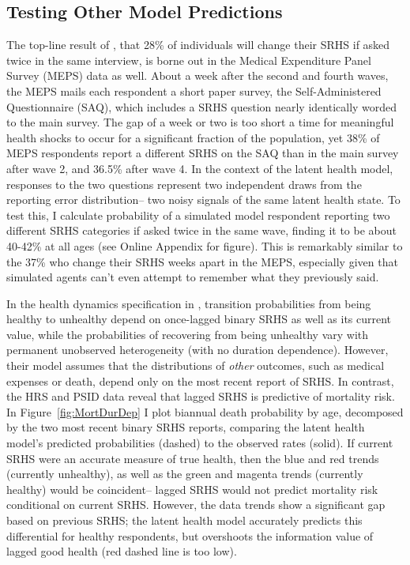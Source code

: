 \documentclass[12pt,pdftex,letterpaper]{article}
\begin{document}
\subsection{Testing Other Model Predictions}\label{sec:Predictions}

The top-line result of \cite{Crossley02}, that 28\% of individuals will change their SRHS if asked twice in the same interview, is borne out in the Medical Expenditure Panel Survey (MEPS) data as well.  About a week after the second and fourth waves, the MEPS mails each respondent a short paper survey, the Self-Administered Questionnaire (SAQ), which includes a SRHS question nearly identically worded to the main survey. The gap of a week or two is too short a time for meaningful health shocks to occur for a significant fraction of the population, yet 38\% of MEPS respondents report a different SRHS on the SAQ than in the main survey after wave 2, and 36.5\% after wave 4.  In the context of the latent health model, responses to the two questions represent two independent draws from the reporting error distribution-- two noisy signals of the same latent health state. To test this, I calculate probability of a simulated model respondent reporting two different SRHS categories if asked twice in the same wave, finding it to be about 40-42\% at all ages (see Online Appendix for figure). This is remarkably similar to the 37\% who change their SRHS weeks apart in the MEPS, especially given that simulated agents can't even attempt to remember what they previously said.

In the health dynamics specification in \cite{DeNardi18}, transition probabilities from being healthy to unhealthy depend on once-lagged binary SRHS as well as its current value, while the probabilities of recovering from being unhealthy vary with permanent unobserved heterogeneity (with no duration dependence). However, their model assumes that the distributions of \textit{other} outcomes, such as medical expenses or death, depend only on the most recent report of SRHS. In contrast, the HRS and PSID data reveal that lagged SRHS is predictive of mortality risk. In Figure~\ref{fig:MortDurDep} I plot biannual death probability by age, decomposed by the two most recent binary SRHS reports, comparing the latent health model's predicted probabilities (dashed) to the observed rates (solid). If current SRHS were an accurate measure of true health, then the blue and red trends (currently unhealthy), as well as the green and magenta trends (currently healthy) would be coincident-- lagged SRHS would not predict mortality risk conditional on current SRHS. However, the data trends show a significant gap based on previous SRHS; the latent health model accurately predicts this differential for healthy respondents, but overshoots the information value of lagged good health (red dashed line is too low).
\end{document}
